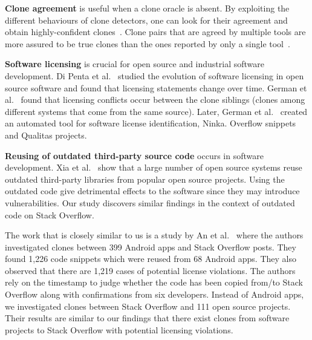 \documentclass[sigconf,review, anonymous]{acmart}
\begin{document}
\textbf{Clone agreement} is useful when a clone oracle is
absent. %
By exploiting the different behaviours of clone detectors,
one can look for their agreement and obtain
highly-confident clones~\cite{Bellon2007,Wang2013}. %
Clone pairs that are agreed by multiple tools are more assured to be true
clones than the ones reported by only a single
tool~\cite{Wang2013,cr2016ssbse,Funaro2010}. 

\textbf{Software licensing} is crucial for open source and 
industrial software development. Di Penta et al.~\cite{DiPenta2010}
studied the evolution of software licensing in open source 
software and found that licensing statements change over 
time. German et al.~\cite{German2009} found that licensing 
conflicts occur between the clone siblings (clones among 
different systems that come from the same source). Later, 
German et al.~\cite{German2010} created an automated tool 
for software license identification, Ninka. 
Overflow snippets and Qualitas projects. 

\textbf{Reusing of outdated third-party source code} occurs 
in software development. Xia et al.~\cite{Xia2014} show that 
a large number of open source systems reuse outdated third-party 
libraries from popular open source projects. Using the outdated 
code give detrimental effects to the software since they may 
introduce vulnerabilities. Our study discovers similar findings 
in the context of outdated code on Stack Overflow.

The work that is closely similar to us is a study by 
An et al.~\cite{An2017} where the authors investigated 
clones between 399 Android apps and Stack Overflow posts. 
They found 1,226 code snippets which were reused from 68 Android apps. 
They also observed that there are 1,219 cases of potential 
license violations. The authors rely on the timestamp to 
judge whether the code has been copied from/to Stack Overflow 
along with confirmations from six developers. Instead of Android apps, 
we investigated clones between Stack Overflow and 111 open 
source projects. Their results are similar to our findings that 
there exist clones from software projects to Stack Overflow with 
potential licensing violations. 
\end{document}
